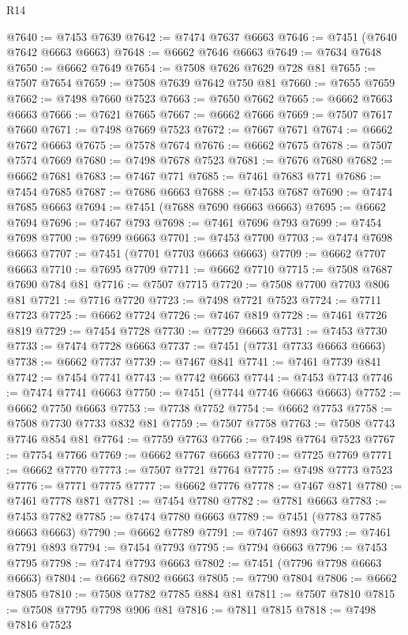 \begin{lexlean}{R14}
\begin{coremodule}
@7640 := @7453 @7639
@7642 := @7474 @7637 @6663
@7646 := @7451 (@7640 @7642 @6663 @6663)
@7648 := @6662 @7646 @6663
@7649 := @7634 @7648
@7650 := @6662 @7649
@7654 := @7508 @7626 @7629 @728 @81
@7655 := @7507 @7654
@7659 := @7508 @7639 @7642 @750 @81
@7660 := @7655 @7659
@7662 := @7498 @7660 @7523
@7663 := @7650 @7662
@7665 := @6662 @7663 @6663
@7666 := @7621 @7665
@7667 := @6662 @7666
@7669 := @7507 @7617 @7660
@7671 := @7498 @7669 @7523
@7672 := @7667 @7671
@7674 := @6662 @7672 @6663
@7675 := @7578 @7674
@7676 := @6662 @7675
@7678 := @7507 @7574 @7669
@7680 := @7498 @7678 @7523
@7681 := @7676 @7680
@7682 := @6662 @7681
@7683 := @7467 @771
@7685 := @7461 @7683 @771
@7686 := @7454 @7685
@7687 := @7686 @6663
@7688 := @7453 @7687
@7690 := @7474 @7685 @6663
@7694 := @7451 (@7688 @7690 @6663 @6663)
@7695 := @6662 @7694
@7696 := @7467 @793
@7698 := @7461 @7696 @793
@7699 := @7454 @7698
@7700 := @7699 @6663
@7701 := @7453 @7700
@7703 := @7474 @7698 @6663
@7707 := @7451 (@7701 @7703 @6663 @6663)
@7709 := @6662 @7707 @6663
@7710 := @7695 @7709
@7711 := @6662 @7710
@7715 := @7508 @7687 @7690 @784 @81
@7716 := @7507 @7715
@7720 := @7508 @7700 @7703 @806 @81
@7721 := @7716 @7720
@7723 := @7498 @7721 @7523
@7724 := @7711 @7723
@7725 := @6662 @7724
@7726 := @7467 @819
@7728 := @7461 @7726 @819
@7729 := @7454 @7728
@7730 := @7729 @6663
@7731 := @7453 @7730
@7733 := @7474 @7728 @6663
@7737 := @7451 (@7731 @7733 @6663 @6663)
@7738 := @6662 @7737
@7739 := @7467 @841
@7741 := @7461 @7739 @841
@7742 := @7454 @7741
@7743 := @7742 @6663
@7744 := @7453 @7743
@7746 := @7474 @7741 @6663
@7750 := @7451 (@7744 @7746 @6663 @6663)
@7752 := @6662 @7750 @6663
@7753 := @7738 @7752
@7754 := @6662 @7753
@7758 := @7508 @7730 @7733 @832 @81
@7759 := @7507 @7758
@7763 := @7508 @7743 @7746 @854 @81
@7764 := @7759 @7763
@7766 := @7498 @7764 @7523
@7767 := @7754 @7766
@7769 := @6662 @7767 @6663
@7770 := @7725 @7769
@7771 := @6662 @7770
@7773 := @7507 @7721 @7764
@7775 := @7498 @7773 @7523
@7776 := @7771 @7775
@7777 := @6662 @7776
@7778 := @7467 @871
@7780 := @7461 @7778 @871
@7781 := @7454 @7780
@7782 := @7781 @6663
@7783 := @7453 @7782
@7785 := @7474 @7780 @6663
@7789 := @7451 (@7783 @7785 @6663 @6663)
@7790 := @6662 @7789
@7791 := @7467 @893
@7793 := @7461 @7791 @893
@7794 := @7454 @7793
@7795 := @7794 @6663
@7796 := @7453 @7795
@7798 := @7474 @7793 @6663
@7802 := @7451 (@7796 @7798 @6663 @6663)
@7804 := @6662 @7802 @6663
@7805 := @7790 @7804
@7806 := @6662 @7805
@7810 := @7508 @7782 @7785 @884 @81
@7811 := @7507 @7810
@7815 := @7508 @7795 @7798 @906 @81
@7816 := @7811 @7815
@7818 := @7498 @7816 @7523

\end{coremodule}
\end{lexlean}
